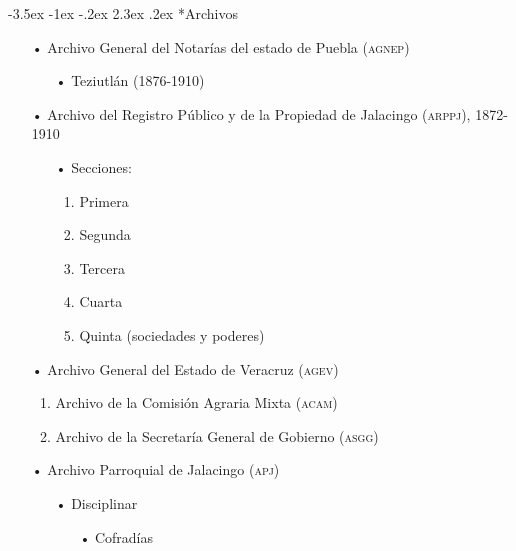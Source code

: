 \documentclass[14pt,twoside,final]{extbook} %
\makeatletter
\renewcommand\section{\@startsection {section}{1}{\z@}%
                                     {-3.5ex \@plus -1ex \@minus -.2ex}%
                                     {2.3ex \@plus .2ex}%
                                     {\normalfont\large\bfseries\sc}}
\makeatother
\begin{document}
\section*{Archivos}\label{sec:archivos}
\begin{itemize}[noitemsep]
\item[•]Archivo General del Notarías del estado de Puebla (\textsc{agnep})
\begin{itemize}
\item[•]Teziutlán (1876-1910)
\end{itemize}
\end{itemize}
\begin{itemize}[noitemsep]
\item[•]Archivo del Registro Público y de la Propiedad de Jalacingo (\textsc{arppj}), 1872-1910
\begin{itemize}[noitemsep]
\item[•]Secciones:
\begin{enumerate}[noitemsep]
\item Primera
\item Segunda
\item Tercera
\item Cuarta
\item Quinta (sociedades y poderes)
\end{enumerate}
\end{itemize}
\end{itemize}
\begin{itemize}[noitemsep]
\item[•]Archivo General del Estado de Veracruz (\textsc{agev})
\begin{enumerate}[noitemsep]
\item Archivo de la Comisión Agraria Mixta (\textsc{acam})
\item Archivo de la Secretaría General de Gobierno (\textsc{asgg})
\end{enumerate}
\end{itemize}
\begin{itemize}[noitemsep]
\item[•]Archivo Parroquial de Jalacingo (\textsc{apj})
\begin{itemize}[noitemsep]
\item[•]Disciplinar
\begin{itemize}[noitemsep]
\item[•]Cofradías
\end{itemize}
\end{itemize}
\end{itemize}
\end{document}
